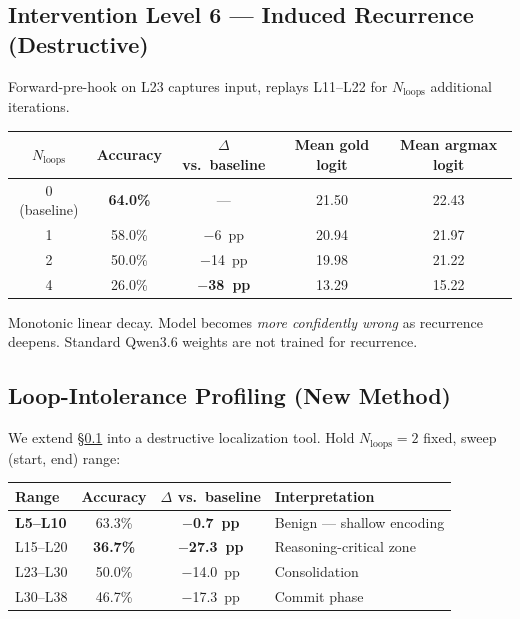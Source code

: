 \documentclass[11pt]{article}
\begin{document}
\subsection{Intervention Level 6 --- Induced Recurrence (Destructive)}\label{sec:recurrence}
Forward-pre-hook on L23 captures input, replays L11--L22 for $N_\text{loops}$ additional iterations.

\begin{table}[h]
\centering
\begin{tabular}{ccccc}
\toprule
$N_\text{loops}$ & Accuracy & $\Delta$ vs.\ baseline & Mean gold logit & Mean argmax logit \\
\midrule
0 (baseline) & \textbf{64.0\%} & --- & 21.50 & 22.43 \\
1 & 58.0\% & $-$6~pp & 20.94 & 21.97 \\
2 & 50.0\% & $-$14~pp & 19.98 & 21.22 \\
4 & 26.0\% & \textbf{$-$38~pp} & 13.29 & 15.22 \\
\bottomrule
\end{tabular}
\end{table}

Monotonic linear decay. Model becomes \emph{more confidently wrong} as recurrence deepens. Standard Qwen3.6 weights are not trained for recurrence.

\subsection{Loop-Intolerance Profiling (New Method)}\label{sec:lip}

We extend \S\ref{sec:recurrence} into a destructive localization tool. Hold $N_\text{loops}=2$ fixed, sweep (start, end) range:

\begin{table}[h]
\centering
\begin{tabular}{lccl}
\toprule
Range & Accuracy & $\Delta$ vs.\ baseline & Interpretation \\
\midrule
\textbf{L5--L10} & 63.3\% & \textbf{$-$0.7~pp} & Benign --- shallow encoding \\
L15--L20 & \textbf{36.7\%} & \textbf{$-$27.3~pp} & Reasoning-critical zone \\
L23--L30 & 50.0\% & $-$14.0~pp & Consolidation \\
L30--L38 & 46.7\% & $-$17.3~pp & Commit phase \\
\bottomrule
\end{tabular}
\end{table}
\end{document}

